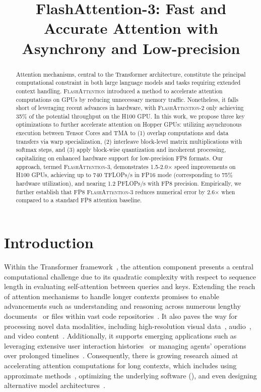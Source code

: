 \title{FlashAttention-3: Fast and Accurate Attention with Asynchrony and Low-precision}

\begin{abstract}
Attention mechanisms, central to the Transformer architecture, constitute the principal computational constraint in both large language models and tasks requiring extended context handling. 
\textsc{FlashAttention} introduced a method to accelerate attention computations on GPUs by reducing unnecessary memory traffic. Nonetheless, it falls short of leveraging recent advances in hardware, with \textsc{FlashAttention-2} only achieving 35\% of the potential throughput on the H100 GPU. In this work, we propose three key optimizations to further accelerate attention on Hopper GPUs: utilizing asynchronous execution between Tensor Cores and TMA to (1) overlap computations and data transfers via warp specialization, (2) interleave block-level matrix multiplications with softmax steps, and (3) apply block-wise quantization and incoherent processing, capitalizing on enhanced hardware support for low-precision FP8 formats. Our approach, termed \textsc{FlashAttention-3}, demonstrates 1.5-2.0$\times$ speed improvements on H100 GPUs, achieving up to 740 TFLOPs/s in FP16 mode (corresponding to 75\% hardware utilization), and nearing 1.2 PFLOPs/s with FP8 precision. Empirically, we further establish that FP8 \textsc{FlashAttention-3} reduces numerical error by 2.6$\times$ when compared to a standard FP8 attention baseline.
\end{abstract}

\section{Introduction}
\label{sec:intro}

Within the Transformer framework~\citep{vaswani2017attention}, the attention component presents a central computational challenge due to its quadratic complexity with respect to sequence length in evaluating self-attention between queries and keys. Extending the reach of attention mechanisms to handle longer contexts promises to enable advancements such as understanding and reasoning across numerous lengthy documents~\citep{guo2021longt5,shaham2022scrolls,peng2023yarn} or files within vast code repositories~\citep{roziere2023code, li2023starcoder}. It also paves the way for processing novel data modalities, including high-resolution visual data~\citep{chen2022scaling}, audio~\citep{gulati2020conformer}, and video content~\citep{ho2022video}. Additionally, it supports emerging applications such as leveraging extensive user interaction histories~\citep{sun2019bert4rec} or managing agents’ operations over prolonged timelines~\citep{yao2022react}. Consequently, there is growing research aimed at accelerating attention computations for long contexts, which includes using approximate methods~\citep{katharopoulos2020transformers,choromanski2020rethinking,
tay2020efficient}, optimizing the underlying software (\citep{rabe2021self,dao2022flashattention,kwon2023efficient}), and even designing alternative model architectures~\citep{peng2023rwkv,sun2023retentive,gu2023mamba}.

